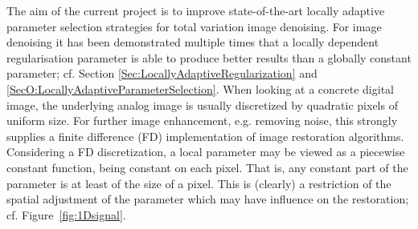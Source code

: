 \documentclass[enabledeprecatedfontcommands,cleardoublepage=empty,headsepline,twoside,11pt,DIV=15,BCOR=12mm,final]{scrartcl}
\begin{document}
The aim of the current project is to improve state-of-the-art locally adaptive parameter selection strategies for total variation image denoising. %
For image denoising it has been demonstrated multiple times that a locally dependent regularisation parameter is able to produce better results than a globally constant parameter; cf. Section \ref{Sec:LocallyAdaptiveRegularization} and \ref{SecO:LocallyAdaptiveParameterSelection}. %
When looking at a concrete digital image, the underlying analog image is usually discretized by quadratic pixels of uniform size. For further image enhancement, e.g. removing noise, this strongly supplies a finite difference (FD) implementation of image restoration algorithms. Considering a FD discretization, a local parameter may be viewed as a piecewise constant function, being constant on each pixel. That is, any constant part of the parameter is at least of the size of a pixel. This is (clearly) a restriction of the spatial adjustment of the parameter which may have influence on the restoration; cf. Figure~\ref{fig:1Dsignal}.
\end{document}
